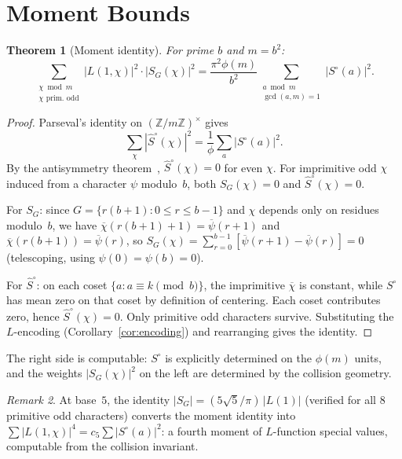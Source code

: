 \documentclass[12pt]{amsart}
\newtheorem{theorem}{Theorem}
\theoremstyle{definition}
\theoremstyle{remark}
\newtheorem{remark}[theorem]{Remark}
\begin{document}
\section{Moment Bounds}

\begin{theorem}[Moment identity]\label{thm:moment}
For prime $b$ and $m = b^2$:
\[
\sum_{\substack{\chi \bmod m \\
\chi \text{ prim.\ odd}}}
|L(1, \chi)|^2 \cdot |S_G(\chi)|^2
= \frac{\pi^2 \phi(m)}{b^2}
\sum_{\substack{a \bmod m \\
\gcd(a,m)=1}} |S^{\circ}(a)|^2.
\]
\end{theorem}

\begin{proof}
Parseval's identity on
$(\mathbb{Z}/m\mathbb{Z})^{\times}$ gives
\[
\sum_{\chi} |\hat{S}^{\circ}(\chi)|^2
= \frac{1}{\phi} \sum_a |S^{\circ}(a)|^2.
\]
By the antisymmetry theorem~\cite{paperB},
$\hat{S}^{\circ}(\chi) = 0$ for even $\chi$.
For imprimitive odd $\chi$ induced from a character
$\psi$ modulo~$b$, both $S_G(\chi) = 0$ and
$\hat{S}^{\circ}(\chi) = 0$.

For $S_G$: since $G = \{r(b{+}1) : 0 \le r \le b{-}1\}$
and $\chi$ depends only on residues modulo~$b$,
we have $\overline{\chi}(r(b{+}1){+}1) = \overline{\psi}(r{+}1)$
and $\overline{\chi}(r(b{+}1)) = \overline{\psi}(r)$, so
$S_G(\chi) = \sum_{r=0}^{b-1}
[\overline{\psi}(r{+}1) - \overline{\psi}(r)] = 0$
(telescoping, using $\psi(0) = \psi(b) = 0$).

For $\hat{S}^{\circ}$: on each coset
$\{a : a \equiv k \pmod{b}\}$, the imprimitive
$\overline{\chi}$ is constant, while $S^{\circ}$ has
mean zero on that coset by definition of centering.
Each coset contributes zero, hence
$\hat{S}^{\circ}(\chi) = 0$. Only primitive odd characters
survive. Substituting
the $L$-encoding (Corollary~\ref{cor:encoding})
and rearranging gives the identity.
\end{proof}

The right side is computable: $S^{\circ}$ is explicitly
determined on the $\phi(m)$ units, and the weights
$|S_G(\chi)|^2$ on the left are determined by
the collision geometry.

\begin{remark}
At base~$5$, the identity
$|S_G| = (5\sqrt{5}/\pi)\, |L(1)|$ (verified for
all $8$ primitive odd characters) converts the
moment identity into $\sum |L(1, \chi)|^4
= c_5 \sum |S^{\circ}(a)|^2$: a fourth moment
of $L$-function special values, computable from
the collision invariant.
\end{remark}
\end{document}
